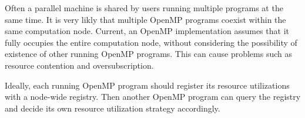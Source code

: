 Often a parallel machine is shared by users running multiple programs at the same time.
It is very likly that multiple OpenMP programs coexist within the same computation node. 
Current, an OpenMP implementation assumes that it fully occupies the entire computation node,
without considering the possibility of existence of other running OpenMP programs. 
This can cause problems such as resource contention and oversubscription.

Ideally, each running OpenMP program should register its resource utilizations with a node-wide registry.
Then another OpenMP program can query the registry and decide its own resource utilization strategy accordingly. 
